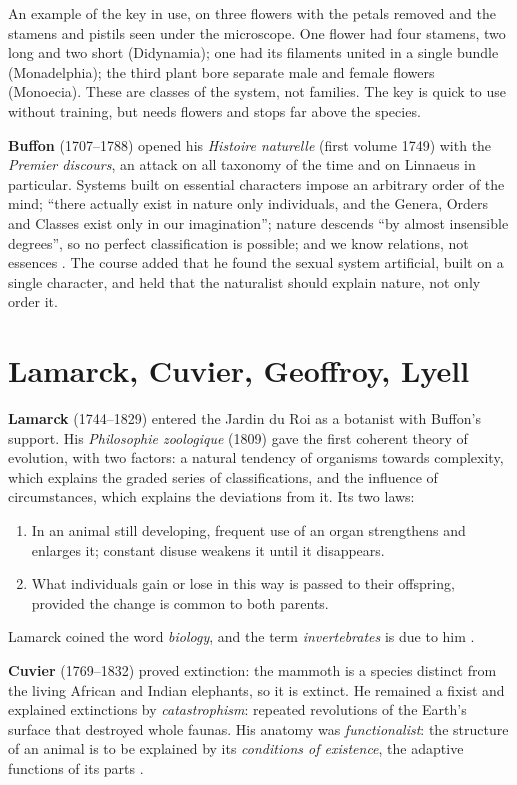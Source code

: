 An example of the key in use, on three
flowers with the petals removed and the
stamens and pistils seen under the
microscope. One flower
had four stamens, two long and two short
(Didynamia); one had its filaments united
in a single bundle (Monadelphia); the third
plant bore separate male and female flowers
(Monoecia). These are classes of the
system, not families. The key is quick to
use without training, but needs flowers and
stops far above the species.

\textbf{Buffon} (1707--1788) opened his
\emph{Histoire naturelle} (first volume
1749) with the \emph{Premier discours}, an
attack on all taxonomy of the time and on
Linnaeus in particular. Systems built on
essential characters impose an arbitrary
order of the mind; ``there actually exist
in nature only individuals, and the
Genera, Orders and Classes exist only in
our imagination''; nature descends ``by
almost insensible degrees'', so no perfect
classification is possible; and we know
relations, not essences
\cite{sloan2008buffon}. The course added
that he found the sexual system artificial,
built on a single character, and held that
the naturalist should explain nature, not
only order it.

\section{Lamarck, Cuvier, Geoffroy, Lyell}
\label{section-lamarck-cuvier-lyell}

\textbf{Lamarck} (1744--1829) entered the
Jardin du Roi as a botanist with Buffon's
support. His \emph{Philosophie zoologique}
(1809) gave the first coherent theory of
evolution, with two factors: a natural
tendency of organisms towards complexity,
which explains the graded series of
classifications, and the influence of
circumstances, which explains the
deviations from it. Its two laws:
\begin{enumerate}
\item In an animal still developing,
frequent use of an organ strengthens and
enlarges it; constant disuse weakens it
until it disappears.
\item What individuals gain or lose in this
way is passed to their offspring, provided
the change is common to both parents.
\end{enumerate}
Lamarck coined the word \emph{biology}, and
the term \emph{invertebrates} is due to
him \cite{ledesma2008lamarck}.

\textbf{Cuvier} (1769--1832) proved
extinction: the mammoth is a species
distinct from the living African and
Indian elephants, so it is extinct. He
remained a fixist and explained
extinctions by \emph{catastrophism}:
repeated revolutions of the Earth's
surface that destroyed whole faunas. His
anatomy was \emph{functionalist}: the
structure of an animal is to be explained
by its \emph{conditions of existence}, the
adaptive functions of its parts
\cite{zamora2008forma}.

